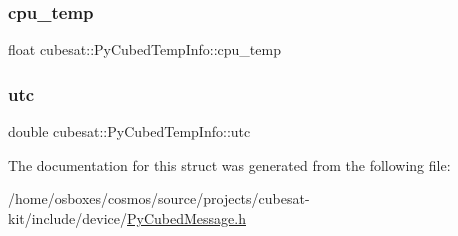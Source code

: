 \mbox{\label{structcubesat_1_1PyCubedTempInfo_ae0773ca752df2cd590263f0a8d39e404}} 
\subsubsection{\texorpdfstring{cpu\+\_\+temp}{cpu\_temp}}
{\footnotesize\ttfamily float cubesat\+::\+Py\+Cubed\+Temp\+Info\+::cpu\+\_\+temp}

\mbox{\label{structcubesat_1_1PyCubedTempInfo_aa2e137388f0e71ddc9f8f528ec66dd20}} 
\subsubsection{\texorpdfstring{utc}{utc}}
{\footnotesize\ttfamily double cubesat\+::\+Py\+Cubed\+Temp\+Info\+::utc}



The documentation for this struct was generated from the following file\+:\begin{DoxyCompactItemize}
\item 
/home/osboxes/cosmos/source/projects/cubesat-\/kit/include/device/\hyperlink{PyCubedMessage_8h}{Py\+Cubed\+Message.\+h}\end{DoxyCompactItemize}
